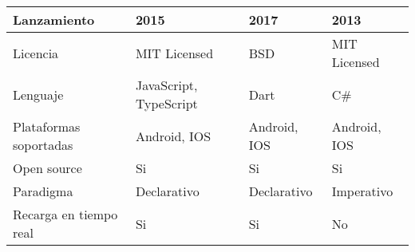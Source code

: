 \begin{longtable}{|p{5cm}|p{3cm}|p{3cm}|p{3cm}|}
    \hline \hline
    \endlastfoot
    Lanzamiento                                    & 2015                                                      & 2017                                                                                                           & 2013                                                                                                                         \\\hline
    Licencia                                       & MIT Licensed                                              & BSD                                                                                                            & MIT Licensed                                                                                                                 \\\hline
    Lenguaje                                       & JavaScript, TypeScript                                    & Dart                                                                                                           & C\#                                                                                                                          \\\hline
    Plataformas soportadas                         & Android, IOS                                              & Android, IOS                                                                                                   & Android, IOS                                                                                                                 \\\hline
    Open source                                    & Si                                                        & Si                                                                                                             & Si                                                                                                                           \\\hline
    Paradigma                                      & Declarativo                                               & Declarativo                                                                                                    & Imperativo                                                                                                                   \\\hline
    Recarga en tiempo real                         & Si                                                        & Si                                                                                                             & No                                                                                                                           \\\hline

\end{longtable}
